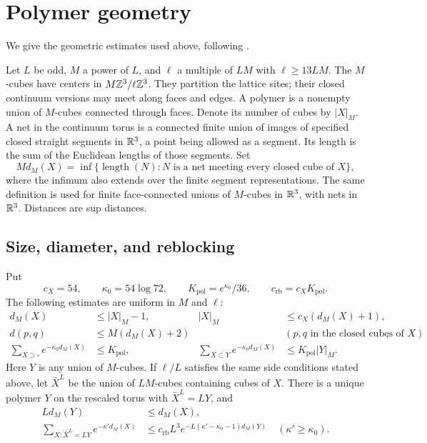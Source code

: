 \section{Polymer geometry}\label{app:polymer-geometry}

We give the geometric estimates used above, following
\cite[Appendix~A]{QED3Manuscript}.

Let $L$ be odd, $M$ a power of $L$, and $\ell$ a multiple of $LM$
with $\ell\ge13LM$. The $M$-cubes have centers in
$M\mathbb Z^3/\ell\mathbb Z^3$. They partition the lattice sites; their closed
continuum versions may meet along faces and edges. A polymer is a
nonempty union of $M$-cubes connected through faces. Denote its number
of cubes by $|X|_M$. A net in the continuum torus is a connected
finite union of images of specified closed straight segments
in $\mathbb R^3$, a point being allowed as a segment.
Its length is the sum of the Euclidean lengths of those segments.
Set
\[
 Md_M(X)=\inf\{\operatorname{length}(N):N
             \text{ is a net meeting every closed cube of }X\},
\]
where the infimum also extends over the finite segment representations.
The same definition is used for finite face-connected unions of
$M$-cubes in $\mathbb R^3$, with nets in $\mathbb R^3$. Distances are sup distances.

\subsection{Size, diameter, and reblocking}

Put
\[
 c_X=54,\qquad \kappa_0=54\log72,\qquad
 K_{\mathrm{pol}}=e^{\kappa_0}/36,\qquad c_{\mathrm{rb}}=c_XK_{\mathrm{pol}}.
\]
The following estimates are uniform in $M$ and $\ell$:
\begin{align}
 d_M(X)&\le |X|_M-1,&
 |X|_M&\le c_X(d_M(X)+1),\label{eq:polymer-size-tree}\\
 d(p,q)&\le M(d_M(X)+2)
       &&(p,q\text{ in the closed cubes of }X),
                                  \label{eq:polymer-diameter}\\
 \sum_{X\supset\square}e^{-\kappa_0d_M(X)}&\le K_{\mathrm{pol}},&
 \sum_{X\subset Y}e^{-\kappa_0d_M(X)}&\le K_{\mathrm{pol}}|Y|_M.
                                  \label{eq:polymer-counting}
\end{align}
Here $Y$ is any union of $M$-cubes. If $\ell/L$ satisfies the same
side conditions stated above, let $\bar X^L$ be the union of $LM$-cubes containing cubes of
$X$. There is a unique polymer $Y$ on the rescaled torus with
$\bar X^L=LY$, and
\begin{align}
 Ld_M(Y)&\le d_M(X),\label{eq:polymer-reblock-tree}\\
 \sum_{X:\bar X^L=LY}e^{-\kappa'd_M(X)}
      &\le c_{\mathrm{rb}}L^3
           e^{-L(\kappa'-\kappa_0-1)d_M(Y)}
                     \quad(\kappa'\ge\kappa_0).
                                  \label{eq:polymer-reblock-sum}
\end{align}

